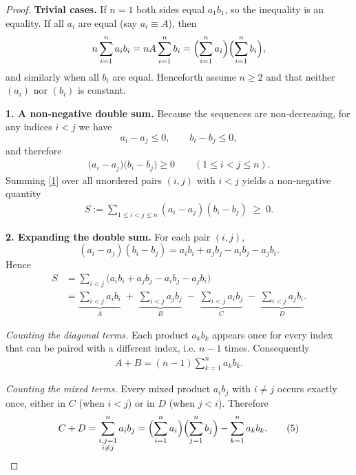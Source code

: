 \begin{proof}
\textbf{Trivial cases.}  
If \(n=1\) both sides equal \(a_{1}b_{1}\), so the inequality is an equality.  
If all \(a_i\) are equal (say \(a_i\equiv A\)), then
\[
n\sum_{i=1}^{n}a_i b_i = nA\sum_{i=1}^{n}b_i 
    = \Bigl(\sum_{i=1}^{n}a_i\Bigr)\Bigl(\sum_{i=1}^{n}b_i\Bigr),
\]
and similarly when all \(b_i\) are equal.  
Henceforth assume \(n\ge2\) and that neither \((a_i)\) nor \((b_i)\) is constant.

\medskip

\textbf{1. A non‑negative double sum.}  
Because the sequences are non‑decreasing, for any indices \(i<j\) we have
\[
a_i-a_j\le0,\qquad b_i-b_j\le0,
\]
and therefore
\begin{align}
\bigl(a_i-a_j\bigr)\bigl(b_i-b_j\bigr)\ge0
\qquad(1\le i<j\le n). \tag{1}
\end{align}
Summing \eqref{1} over all unordered pairs \((i,j)\) with \(i<j\) yields a non‑negative quantity
\begin{align}
S:=\sum_{1\le i<j\le n}(a_i-a_j)(b_i-b_j)\;\ge\;0 . \tag{2}
\end{align}

\medskip

\textbf{2. Expanding the double sum.}  
For each pair \((i,j)\),
\[
(a_i-a_j)(b_i-b_j)=a_i b_i + a_j b_j - a_i b_j - a_j b_i .
\]
Hence
\begin{align}
S
&=\sum_{i<j}\bigl(a_i b_i + a_j b_j - a_i b_j - a_j b_i\bigr) \\
&=\underbrace{\sum_{i<j}a_i b_i}_{A}
  \;+\;\underbrace{\sum_{i<j}a_j b_j}_{B}
  \;-\;\underbrace{\sum_{i<j}a_i b_j}_{C}
  \;-\;\underbrace{\sum_{i<j}a_j b_i}_{D}. \tag{3}
\end{align}

\textit{Counting the diagonal terms.}  
Each product \(a_k b_k\) appears once for every index that can be paired with a different index, i.e. \(n-1\) times. Consequently
\begin{align}
A+B=(n-1)\sum_{k=1}^{n} a_k b_k . \tag{4}
\end{align}

\textit{Counting the mixed terms.}  
Every mixed product \(a_i b_j\) with \(i\neq j\) occurs exactly once, either in \(C\) (when \(i<j\)) or in \(D\) (when \(j<i\)). Therefore
\begin{align}
C+D=\sum_{\substack{i,j=1\\ i\neq j}}^{n} a_i b_j
    =\Bigl(\sum_{i=1}^{n}a_i\Bigr)\Bigl(\sum_{j=1}^{n}b_j\Bigr)-\sum_{k=1}^{n} a_k b_k . \tag{5}
\end{align}


\end{proof}
